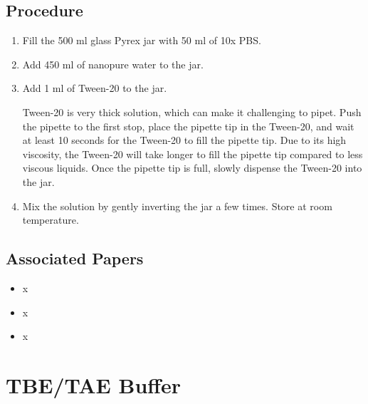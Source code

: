 \documentclass[
  letterpaper,
  DIV=11,
  numbers=noendperiod]{scrreprt}
\providecommand{\tightlist}{%
  \setlength{\itemsep}{0pt}\setlength{\parskip}{0pt}}\usepackage{longtable,booktabs,array}
\begin{document}
\hypertarget{procedure-96}{%
\section{Procedure}\label{procedure-96}}

\begin{enumerate}
\def\labelenumi{\arabic{enumi}.}
\item
  Fill the 500 ml glass Pyrex jar with 50 ml of 10x PBS.
\item
  Add 450 ml of nanopure water to the jar.
\item
  Add 1 ml of Tween-20 to the jar.

  \begin{tcolorbox}[enhanced jigsaw, rightrule=.15mm, title=\textcolor{quarto-callout-important-color}{\faExclamation}\hspace{0.5em}{NOTE}, titlerule=0mm, opacitybacktitle=0.6, toprule=.15mm, bottomrule=.15mm, opacityback=0, left=2mm, colframe=quarto-callout-important-color-frame, breakable, coltitle=black, colback=white, colbacktitle=quarto-callout-important-color!10!white, bottomtitle=1mm, leftrule=.75mm, toptitle=1mm, arc=.35mm]

  Tween-20 is very thick solution, which can make it challenging to
  pipet. Push the pipette to the first stop, place the pipette tip in
  the Tween-20, and wait at least 10 seconds for the Tween-20 to fill
  the pipette tip. Due to its high viscosity, the Tween-20 will take
  longer to fill the pipette tip compared to less viscous liquids. Once
  the pipette tip is full, slowly dispense the Tween-20 into the jar.

  \end{tcolorbox}
\item
  Mix the solution by gently inverting the jar a few times. Store at
  room temperature.
\end{enumerate}

\hypertarget{associated-papers-71}{%
\section{Associated Papers}\label{associated-papers-71}}

\begin{itemize}
\tightlist
\item
  x
\item
  x
\item
  x
\end{itemize}

\hypertarget{sec-recipe-TBE_TAE}{%
\chapter{TBE/TAE Buffer}\label{sec-recipe-TBE_TAE}}
\end{document}
